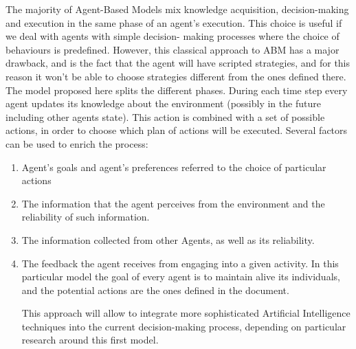 \documentclass[11pt,oneside,a4paper,openright]{report}
\begin{document}


The majority of Agent-Based Models mix knowledge acquisition, decision-making and execution in the
same phase of an agent's execution. This choice is useful if we deal with agents with simple decision-
making processes where the choice of behaviours is predefined. However, this classical approach to
ABM has a major drawback, and is the fact that the agent will have scripted strategies, and for this
reason it won't be able to choose strategies different from the ones defined there.
The model proposed here splits the different phases. During each time step every agent updates its
knowledge about the environment (possibly in the future including other agents state). This action is combined with a set of possible actions, in order to choose which plan of actions will be executed. Several factors can be used to enrich the process:



\begin{enumerate}
	\item Agent's goals and agent's preferences referred to the choice of particular actions
	\item The information that the agent perceives from the environment and the reliability of such
	information.
	\item The information collected from other Agents, as well as its reliability.
	\item The feedback the agent receives from engaging into a given activity.
	In this particular model the goal of every agent is to maintain alive its individuals, and the potential
	actions are the ones defined in the document.

 This approach will allow to integrate more sophisticated Artificial Intelligence techniques into the current decision-making process, depending on particular research around this first model.

\end{enumerate}
\end{document}

